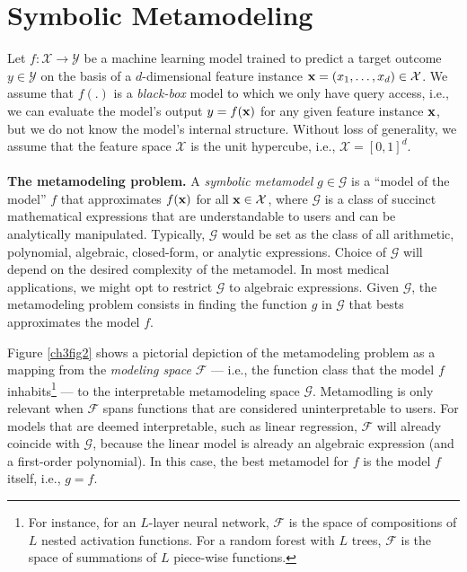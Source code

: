 \documentclass [PhD] {uclathes}
\begin{document}
\section{Symbolic Metamodeling}
\label{ch3sec2}
Let $f:\mathcal{X} \to \mathcal{Y}$ be a machine learning model trained to predict a target outcome $y \in \mathcal{Y}$ on the basis of a $d$-dimensional feature instance ${\bf x} = (x_{1},\ldots,x_{d}) \in \mathcal{X}$. We assume that $f(.)$ is a {\it black-box} model to which we only have query access, i.e., we can evaluate the model's output $y = f({\bf x})$ for any given feature instance ${\bf x}$, but we do not know the model's internal structure. Without loss of generality, we assume that the feature space $\mathcal{X}$ is the unit hypercube, i.e., $\mathcal{X} = [0,1]^d$.\\
\\
{\bf The metamodeling problem.} A {\it symbolic metamodel} $g \in \mathcal{G}$ is a ``model of the model'' $f$ that approximates $f({\bf x})$ for all ${\bf x} \in \mathcal{X}$, where $\mathcal{G}$ is a class of succinct mathematical expressions that are understandable to users and can be analytically manipulated. Typically, $\mathcal{G}$ would be set as the class of all arithmetic, polynomial, algebraic, closed-form, or analytic expressions. Choice of $\mathcal{G}$ will depend on the desired complexity of the metamodel. In most medical applications, we might opt to restrict $\mathcal{G}$ to algebraic expressions. Given $\mathcal{G}$, the metamodeling problem consists in finding the function $g$ in $\mathcal{G}$ that bests approximates the model $f$.

Figure \ref{ch3fig2} shows a pictorial depiction of the metamodeling problem as a mapping from the {\it modeling space} $\mathcal{F}$ --- i.e., the function class that the model $f$ inhabits\footnote{For instance, for an $L$-layer neural network, $\mathcal{F}$ is the space of compositions of $L$ nested activation functions. For a random forest with $L$ trees, $\mathcal{F}$ is the space of summations of $L$ piece-wise functions.} --- to the interpretable metamodeling space $\mathcal{G}$. Metamodling is only relevant when $\mathcal{F}$ spans functions that are considered uninterpretable to users. For models that are deemed interpretable, such as linear regression, $\mathcal{F}$ will already coincide with $\mathcal{G}$, because the linear model is already an algebraic expression (and a first-order polynomial). In this case, the best metamodel for $f$ is the model $f$ itself, i.e., $g = f$.
\end{document}
